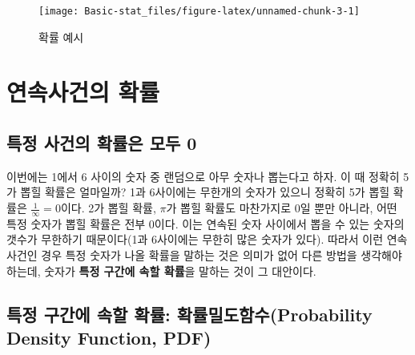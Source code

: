 \documentclass[]{book}
\begin{document}
\begin{figure}

{\centering \texttt{[image: Basic-stat\_files/figure-latex/unnamed-chunk-3-1]} 

}

\caption{확률 예시}\label{fig:unnamed-chunk-3}
\end{figure}

\hypertarget{uxc5f0uxc18duxc0acuxac74uxc758-uxd655uxb960}{%
\section{연속사건의 확률}\label{uxc5f0uxc18duxc0acuxac74uxc758-uxd655uxb960}}

\hypertarget{uxd2b9uxc815-uxc0acuxac74uxc758-uxd655uxb960uxc740-uxbaa8uxb450-0}{%
\subsection{특정 사건의 확률은 모두 0}\label{uxd2b9uxc815-uxc0acuxac74uxc758-uxd655uxb960uxc740-uxbaa8uxb450-0}}

이번에는 1에서 6 사이의 숫자 중 랜덤으로 아무 숫자나 뽑는다고 하자. 이 때 정확히 5가 뽑힐 확률은 얼마일까? 1과 6사이에는 무한개의 숫자가 있으니 정확히 5가 뽑힐 확률은 \(\frac{1}{\infty}=0\)이다. 2가 뽑힐 확률, \(\pi\)가 뽑힐 확률도 마찬가지로 0일 뿐만 아니라, 어떤 특정 숫자가 뽑힐 확률은 전부 0이다. 이는 연속된 숫자 사이에서 뽑을 수 있는 숫자의 갯수가 무한하기 때문이다(1과 6사이에는 무한히 많은 숫자가 있다). 따라서 이런 연속사건인 경우 특정 숫자가 나올 확률을 말하는 것은 의미가 없어 다른 방법을 생각해야 하는데, 숫자가 \textbf{특정 구간에 속할 확률}을 말하는 것이 그 대안이다.

\hypertarget{uxd2b9uxc815-uxad6cuxac04uxc5d0-uxc18duxd560-uxd655uxb960-uxd655uxb960uxbc00uxb3c4uxd568uxc218probability-density-function-pdf}{%
\subsection{특정 구간에 속할 확률: 확률밀도함수(Probability Density Function, PDF)}\label{uxd2b9uxc815-uxad6cuxac04uxc5d0-uxc18duxd560-uxd655uxb960-uxd655uxb960uxbc00uxb3c4uxd568uxc218probability-density-function-pdf}}
\end{document}
